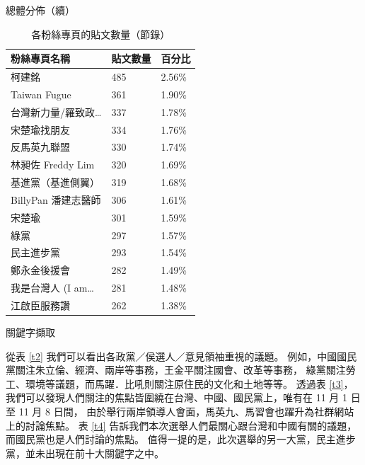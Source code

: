 \documentclass[final,hyperref={pdfpagelabels=false}]{beamer}
\begin{document}
\begin{CJK}{UTF8}{bsmi}
\begin{frame}
\begin{minipage}{0.30\textwidth}
\begin{block}{總體分佈（續）}
  \begin{table}[!htbp]
  \caption{各粉絲專頁的貼文數量（節錄）}
  \label{t1}
  \begin{tabular}{@{}L{12cm}C{5cm}C{5cm}@{}}
  \toprule
  粉絲專頁名稱 & 貼文數量 & 百分比 \\
  \midrule
  柯建銘 & 485 & 2.56\% \\
  Taiwan Fugue & 361 & 1.90\% \\
  台灣新力量/羅致政\dots & 337 & 1.78\% \\
  宋楚瑜找朋友 & 334 & 1.76\% \\
  反馬英九聯盟 & 330 & 1.74\% \\
  林昶佐 Freddy Lim & 320 & 1.69\% \\
  基進黨（基進側翼） & 319 & 1.68\% \\
  BillyPan 潘建志醫師 & 306 & 1.61\% \\
  宋楚瑜 & 301 & 1.59\% \\
  綠黨 & 297 & 1.57\% \\
  民主進步黨 & 293 & 1.54\% \\
  鄭永金後援會 & 282 & 1.49\% \\
  我是台灣人 (I am\dots & 281 & 1.48\% \\
  江啟臣服務讚 & 262 & 1.38\% \\
  \bottomrule
  \end{tabular}
  \end{table}
\end{block}
\end{minipage}
\quad
\begin{minipage}{0.68\textwidth}
\begin{block}{關鍵字擷取}
\begin{minipage}{0.34\textwidth}
  從表 \ref{t2} 我們可以看出各政黨／侯選人／意見領袖重視的議題。%
  例如，中國國民黨關注朱立倫、經濟、兩岸等事務，王金平關注國會、改革等事務，%
  綠黨關注勞工、環境等議題，而馬躍．比吼則關注原住民的文化和土地等等。%
  透過表 \ref{t3}，我們可以發現人們關注的焦點皆圍繞在台灣、中國、國民黨上，唯有在 11 月 1 日至 11 月 8 日間，%
  由於舉行兩岸領導人會面，馬英九、馬習會也躍升為社群網站上的討論焦點。%
  表 \ref{t4} 告訴我們本次選舉人們最關心跟台灣和中國有關的議題，而國民黨也是人們討論的焦點。%
  值得一提的是，此次選舉的另一大黨，民主進步黨，並未出現在前十大關鍵字之中。%
\end{minipage}
\quad
\begin{minipage}{0.30\textwidth}

\end{minipage}
\end{block}
\end{minipage}
\end{frame}
\end{CJK}
\end{document}
